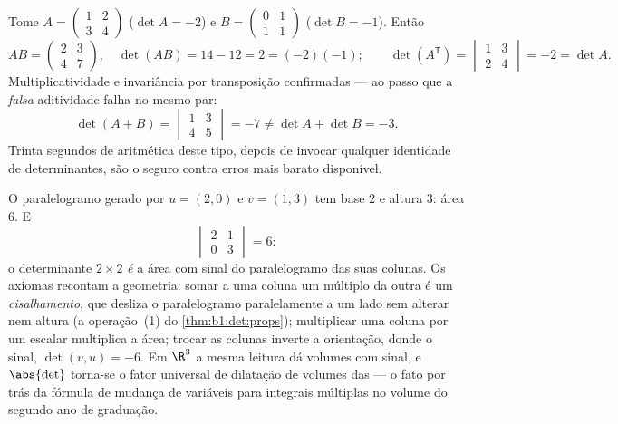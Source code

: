 \begin{example}
\label{ex:b1:det:rulescheck}
Tome $A = \begin{pmatrix} 1 & 2\\ 3 & 4\end{pmatrix}$ ($\det A =
-2$) e $B = \begin{pmatrix} 0 & 1\\ 1 & 1\end{pmatrix}$ ($\det
B = -1$). Então
\[
AB = \begin{pmatrix} 2 & 3\\ 4 & 7\end{pmatrix},
\quad \det(AB) = 14 - 12 = 2 = (-2)(-1) ;
\qquad
\det(A^{\mathsf T}) = \begin{vmatrix} 1 & 3\\ 2 & 4
\end{vmatrix} = -2 = \det A .
\]
Multiplicatividade e invariância por transposição confirmadas ---
ao passo que a \emph{falsa} aditividade falha no mesmo par:
\[
\det(A + B) = \begin{vmatrix} 1 & 3\\ 4 & 5\end{vmatrix} = -7
\neq \det A + \det B = -3 .
\]
Trinta segundos de aritmética deste tipo, depois de invocar qualquer
identidade de determinantes, são o seguro contra erros mais barato
disponível.
\end{example}

\begin{example}
\label{ex:b1:det:area}
O paralelogramo gerado por $u = (2, 0)$ e $v = (1, 3)$ tem base $2$ e altura $3$:
área $6$. E
\[
\begin{vmatrix} 2 & 1\\ 0 & 3\end{vmatrix} = 6 :
\]
o determinante $2\times2$ \emph{é} a área com sinal do paralelogramo das
suas colunas. Os axiomas recontam a geometria: somar a uma coluna um
múltiplo da outra é um \emph{cisalhamento}, que desliza o
paralelogramo paralelamente a um lado sem alterar  nem altura (a
operação~(1) do \cref{thm:b1:det:props}); multiplicar uma coluna por um escalar
multiplica a área; trocar as colunas inverte a orientação, donde o
sinal, $\det(v, u) = -6$. Em $\R^3$ a mesma leitura dá volumes com sinal, e
$\abs{\det}$ torna-se o fator universal de dilatação de volumes das
 --- o fato por trás da fórmula de mudança de
variáveis para integrais múltiplas no volume do segundo ano de
graduação.
\end{example}

